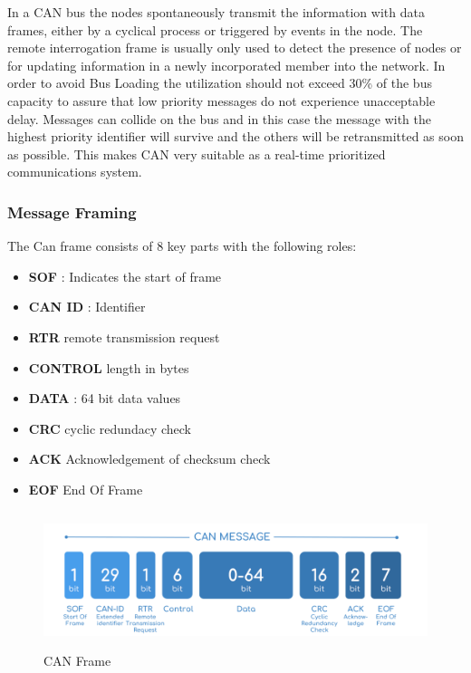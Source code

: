 \documentclass{article}
\begin{document}
In a CAN bus the nodes spontaneously transmit the information with data frames, either by a cyclical process or triggered by events in the
node. The remote interrogation frame is usually only used to detect the presence of nodes or for updating information in a newly incorporated member into the network.
\newline
\newline
In order to avoid Bus Loading the utilization should not exceed 30\% of the bus capacity to assure that low priority messages do not experience unacceptable delay. 
\newline
\newline
Messages can collide on the bus and in this case the message with the highest priority identifier will survive and the others will be retransmitted as soon as possible. This makes CAN very suitable as a real-time prioritized communications system. 

\subsubsection{Message Framing}

The Can frame consists of 8 key parts with the following roles: 

\begin{itemize}
    \item  \textbf{SOF} : Indicates the start of frame
    \item  \textbf{CAN ID}  : Identifier
    \item  \textbf{RTR} remote transmission request
    \item  \textbf{CONTROL} length in bytes
    \item  \textbf{DATA} : 64 bit data values
    \item  \textbf{CRC} cyclic redundacy check
    \item  \textbf{ACK} Acknowledgement of checksum check 
    \item  \textbf{EOF} End Of Frame
\end{itemize}

\begin{figure}[h]    
    \centering
    \includegraphics[width=15cm, height=4cm,center]{images/can_frame}
    \caption{CAN Frame }
\end{figure}
\end{document}
